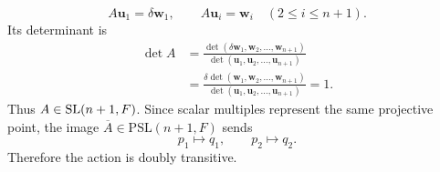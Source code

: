 \documentclass[../Odyssey_Project.tex]{subfiles}
\begin{document}
\begin{solution}
\[
    A\mathbf u_1=\delta\mathbf w_1,
    \qquad
    A\mathbf u_i=\mathbf w_i
    \quad(2\leq i\leq n+1).
\]
Its determinant is
\[
\begin{aligned}
    \det A
    &=
    \frac{\det(\delta\mathbf w_1,\mathbf w_2,\ldots,\mathbf w_{n+1})}
         {\det(\mathbf u_1,\mathbf u_2,\ldots,\mathbf u_{n+1})}  \\
    &=
    \frac{\delta\det(\mathbf w_1,\mathbf w_2,\ldots,\mathbf w_{n+1})}
         {\det(\mathbf u_1,\mathbf u_2,\ldots,\mathbf u_{n+1})}
    =
    1.
\end{aligned}
\]
Thus $A\in\operatorname{SL}(n+1,F)$. Since scalar multiples represent the same projective point, the image $\overline A\in\mathrm{PSL}(n+1,F)$ sends
\[
    p_1\mapsto q_1,
    \qquad
    p_2\mapsto q_2.
\]
Therefore the action is doubly transitive.
\end{solution}
\end{document}
